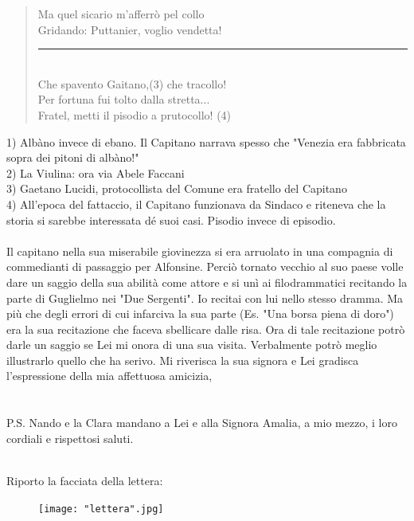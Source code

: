 \documentclass[10pt]{memoir} %
\begin{document}
{\begin{verse}
	Ma quel sicario m'afferrò pel collo\\
	Gridando: Puttanier, voglio vendetta!\\
	\rule{1.5cm}{0.4pt}\\
	Che spavento Gaitano,(3) che tracollo!\\
	Per fortuna fui tolto dalla stretta...\\
	Fratel, metti il pisodio a prutocollo! (4)\\
\end{verse}
1) Albàno invece di ebano. Il Capitano narrava spesso che "Venezia era fabbricata sopra dei pitoni di albàno!"\\
2) La Viulina: ora via Abele Faccani\\
3) Gaetano Lucidi, protocollista del Comune era fratello del Capitano\\
4) All'epoca del fattaccio, il Capitano funzionava da Sindaco e riteneva che la storia si sarebbe interessata dé suoi casi. Pisodio invece di episodio. \\
\\
Il capitano nella sua miserabile giovinezza si era arruolato in una compagnia di commedianti di passaggio per Alfonsine. Perciò tornato vecchio al suo paese volle dare un saggio della sua abilità come attore e si unì ai filodrammatici recitando la parte di Guglielmo nei "Due Sergenti". Io recitai con lui nello stesso dramma. Ma più che degli errori di cui infarciva la sua parte (Es. "Una borsa piena di doro") era la sua recitazione che faceva sbellicare dalle risa. Ora di tale recitazione potrò darle un saggio se Lei mi onora di una sua visita. Verbalmente potrò meglio illustrarlo quello che ha serivo. Mi riverisca la sua signora e Lei gradisca l'espressione della mia affettuosa amicizia,\\
\\\\P.S. Nando e la Clara mandano a Lei e alla Signora Amalia, a mio mezzo, i loro cordiali e rispettosi saluti.
}\\

Riporto la facciata della lettera:\\
\begin{figure}[H]
\begin{center}
\vspace{-10pt}
   \texttt{[image: "lettera".jpg]}\\
  \end{center}
\end{figure}
\end{document}
